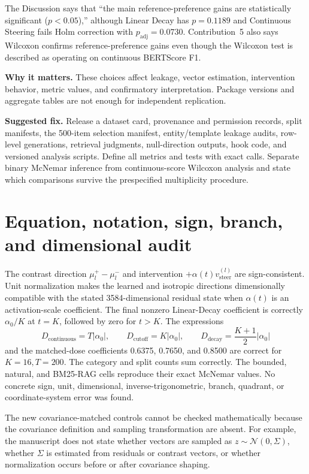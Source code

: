 \documentclass[11pt]{article}
\newcommand{\findinglabel}[1]{\textbf{#1}}
\begin{document}
The Discussion says that ``the main reference-preference gains are statistically significant ($p<0.05$),'' although Linear Decay has $p=0.1189$ and Continuous Steering fails Holm correction with $p_{\mathrm{adj}}=0.0730$.  Contribution~5 also says Wilcoxon confirms reference-preference gains even though the Wilcoxon test is described as operating on continuous BERTScore F1.

\findinglabel{Why it matters.} These choices affect leakage, vector estimation, intervention behavior, metric values, and confirmatory interpretation.  Package versions and aggregate tables are not enough for independent replication.

\findinglabel{Suggested fix.} Release a dataset card, provenance and permission records, split manifests, the 500-item selection manifest, entity/template leakage audits, row-level generations, retrieval judgments, null-direction outputs, hook code, and versioned analysis scripts.  Define all metrics and tests with exact calls.  Separate binary McNemar inference from continuous-score Wilcoxon analysis and state which comparisons survive the prespecified multiplicity procedure.

\section*{Equation, notation, sign, branch, and dimensional audit}

The contrast direction $\mu_l^+-\mu_l^-$ and intervention $+\alpha(t)v_{\text{steer}}^{(l)}$ are sign-consistent.  Unit normalization makes the learned and isotropic directions dimensionally compatible with the stated 3584-dimensional residual state when $\alpha(t)$ is an activation-scale coefficient.  The final nonzero Linear-Decay coefficient is correctly $\alpha_0/K$ at $t=K$, followed by zero for $t>K$.  The expressions
\[
D_{\text{continuous}}=T|\alpha_0|,
\qquad
D_{\text{cutoff}}=K|\alpha_0|,
\qquad
D_{\text{decay}}=\frac{K+1}{2}|\alpha_0|
\]
and the matched-dose coefficients 0.6375, 0.7650, and 0.8500 are correct for $K=16,T=200$.  The category and split counts sum correctly.  The bounded, natural, and BM25-RAG cells reproduce their exact McNemar values.  No concrete sign, unit, dimensional, inverse-trigonometric, branch, quadrant, or coordinate-system error was found.

The new covariance-matched controls cannot be checked mathematically because the covariance definition and sampling transformation are absent.  For example, the manuscript does not state whether vectors are sampled as $z\sim\mathcal N(0,\Sigma)$, whether $\Sigma$ is estimated from residuals or contrast vectors, or whether normalization occurs before or after covariance shaping.
\end{document}
